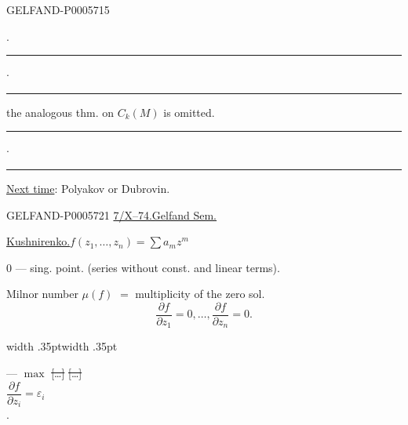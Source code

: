 \begin{GelfandAdjacentEvidence}{GELFAND-P000571}{5}

.
\end{GelfandAdjacentEvidence}

\noindent\hfill\rule{.95cm}{.32pt}\enspace\(\cdot\)\enspace\rule{1.05cm}{.32pt}\par
the analogous thm. on \(C_k(M)\) is omitted.

\noindent\hfill\rule{1.05cm}{.32pt}\enspace\(\cdot\)\enspace\rule{.89cm}{.32pt}\par
\underline{Next time}: Polyakov or Dubrovin.


\begin{GelfandAdjacentEvidence}{GELFAND-P000572}{1}
\underline{7/X--74.}\qquad\underline{Gelfand Sem.}

\underline{Kushnirenko.}\qquad \(f(z_1,\ldots,z_n)=\sum a_m z^m\)

\(0\) — sing. point. (series without const. and linear terms).

Milnor number \(\mu(f)\) \(=\) multiplicity of the zero sol.
\[
\frac{\partial f}{\partial z_1}=0,\ldots,\frac{\partial f}{\partial z_n}=0.
\]
\noindent\hfill\begin{minipage}{.47\linewidth}
\noindent\vrule width .35pt\hspace{1pt}\vrule width .35pt\enspace
\begin{minipage}{.88\linewidth}
— \underline{\(\max\)}  \sout{[\ldots]} \sout{[\ldots]} \\
\(\dfrac{\partial f}{\partial z_i}=\varepsilon_i\)\\
.
\end{minipage}
\end{minipage}\par
{}
\end{GelfandAdjacentEvidence}
